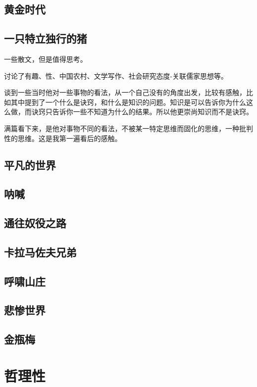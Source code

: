 \documentclass[UTF8,a4paper,12pt]{ctexbook}
\begin{document}
	\section{黄金时代}
	
	\section{一只特立独行的猪}
		一些散文，但是值得思考。
		
		讨论了有趣、性、中国农村、文学写作、社会研究态度-关联儒家思想等。
		
		谈到一些当时他对一些事物的看法，从一个自己没有的角度出发，比较有感触，比如其中提到了一个什么是诀窍，和什么是知识的问题。知识是可以告诉你为什么这么做，而诀窍只告诉你一些不知道为什么的结果。所以他更崇尚知识而不是诀窍。
		
		满篇看下来，是他对事物不同的看法，不被某一特定思维而固化的思维，一种批判性的思维。这是我第一遍看后的感触。
		
	\section{平凡的世界}
		
	\section{呐喊}
	
	\section{通往奴役之路}
	
	\section{卡拉马佐夫兄弟}
	
	\section{呼啸山庄}
	
	\section{悲惨世界}
	
	\section{金瓶梅}
	
\chapter{哲理性}
\end{document}
